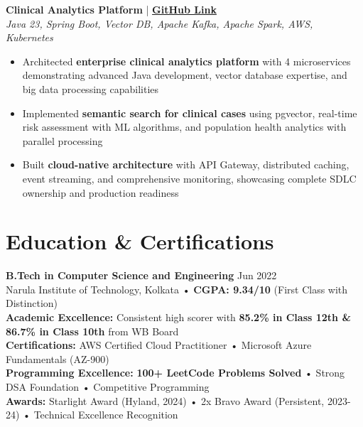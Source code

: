 \documentclass[a4paper,10pt]{article}
\begin{document}
\textbf{Clinical Analytics Platform} | \href{https://github.com/shibam-max/clinical-analytics-platform}{\textbf{GitHub Link}} \\
\textit{Java 23, Spring Boot, Vector DB, Apache Kafka, Apache Spark, AWS, Kubernetes}
\begin{itemize}
    \item Architected \textbf{enterprise clinical analytics platform} with 4 microservices demonstrating advanced Java development, vector database expertise, and big data processing capabilities
    \item Implemented \textbf{semantic search for clinical cases} using pgvector, real-time risk assessment with ML algorithms, and population health analytics with parallel processing
    \item Built \textbf{cloud-native architecture} with API Gateway, distributed caching, event streaming, and comprehensive monitoring, showcasing complete SDLC ownership and production readiness
\end{itemize}

\vspace{-2pt}

\section*{Education \& Certifications}
\vspace{-4pt}
\textbf{B.Tech in Computer Science and Engineering} \hfill Jun 2022 \\
Narula Institute of Technology, Kolkata • \textbf{CGPA: 9.34/10} (First Class with Distinction) \\
\textbf{Academic Excellence:} Consistent high scorer with \textbf{85.2\% in Class 12th \& 86.7\% in Class 10th} from WB Board \\

\textbf{Certifications:} AWS Certified Cloud Practitioner • Microsoft Azure Fundamentals (AZ-900) \\
\textbf{Programming Excellence:} \textbf{100+ LeetCode Problems Solved} • Strong DSA Foundation • Competitive Programming \\
\textbf{Awards:} Starlight Award (Hyland, 2024) • 2x Bravo Award (Persistent, 2023-24) • Technical Excellence Recognition

\vspace{-2pt}
\end{document}
